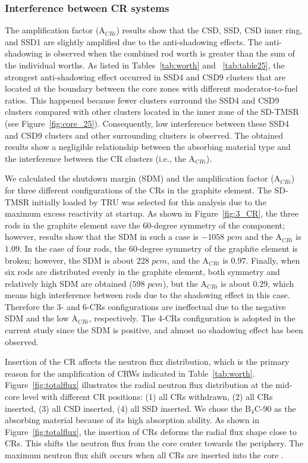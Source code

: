 \subsubsection{Interference between CR systems}

The amplification factor (A$_{CRi}$) results show that the CSD, SSD, CSD inner 
ring, and SSD1 are slightly amplified due to the anti-shadowing effects. The 
anti-shadowing is observed when the combined rod worth is greater than the sum 
of the individual worths. As listed in Tables~\ref{tab:worth} and ~\ref{tab:table25}, the strongest anti-shadowing effect occurred in 
SSD4 and CSD9 clusters that are located at the boundary between the core zones 
with different moderator-to-fuel ratios. This happened because fewer clusters surround the SSD4 and CSD9 clusters compared with other clusters located in the inner zone of the SD-TMSR (see Figure~\ref{fig:core_25}). Consequently, low interference between these SSD4 and CSD9 clusters and other surrounding clusters is observed. The obtained results show a negligible relationship between the absorbing material type and the interference between the CR clusters (i.e., the A$_{CRi}$).

We calculated the shutdown margin (SDM) and the amplification factor (A$_{CRi}$) for three different configurations of the CRs in the graphite element. The SD-TMSR initially loaded by TRU was selected for this analysis due to the maximum excess reactivity at startup. As shown in Figure~\ref{fig:3_CR}, the three rods in the graphite element save the 60-degree symmetry of the component; however, results show that the SDM in such a case is $-1058$ $pcm$ and the A$_{CRi}$ is $1.09$. In the case of four rods, the 60-degree symmetry of the graphite element is broken; however, the SDM is about $228$ $pcm$, and the A$_{CRi}$ is $0.97$. Finally, when six rods are distributed evenly in the graphite element, both symmetry and relatively high SDM are obtained ($598$ $pcm$), but the A$_{CRi}$ is about $0.29$, which means high interference between rods due to the shadowing effect in this case. Therefore the 3- and 6-CRs configurations are ineffectual due to the negative SDM and the low A$_{CRi}$, respectively. The 4-CRs configuration is adopted in the current study since the SDM is positive, and almost no shadowing effect has been observed.

Insertion of the CR affects the neutron flux distribution, which is 
the primary reason for the amplification of CRWs indicated in 
Table~\ref{tab:worth}. Figure~\ref{fig:totalflux} illustrates the radial 
neutron flux distribution at the mid-core level with different CR positions: 
(1) all CRs withdrawn, (2) all CRs inserted, (3) all CSD inserted, (4) all SSD 
inserted. We chose the B$_4$C-90 as the absorbing material because of its high 
absorption ability. As shown in Figure~\ref{fig:totalflux}, the insertion of 
CRs deforms the radial flux shape close to CRs.
This shifts the neutron flux from the core center towards the 
periphery. The maximum neutron flux shift occurs when all CRs are inserted 
into the core \cite{girardin2007control}.

